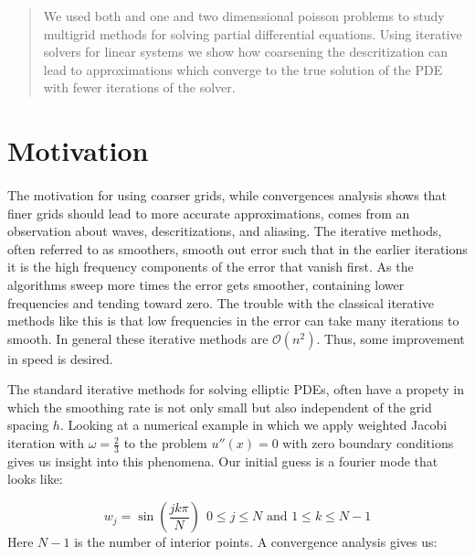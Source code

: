 \documentclass[pdftex,12pt,a4paper]{article}
\begin{document}


\vspace{2 cm}

\begin{abstract}
    We used both and one and two dimenssional poisson problems to study multigrid methods for solving partial differential equations. Using iterative solvers for linear systems we show how coarsening the descritization can lead to approximations which converge to the true solution of the PDE with fewer iterations of the solver. 
\end{abstract}

\section{Motivation}
   
    \paragraph*{} The motivation for using coarser grids, while convergences analysis shows that finer grids should lead to more accurate approximations, comes from an observation about waves, descritizations, and aliasing. The iterative methods, often referred to as smoothers, smooth out error such that in the earlier iterations it is the high frequency components of the error that vanish first. As the algorithms sweep more times the error gets smoother, containing lower frequencies and tending toward zero. The trouble with the classical iterative methods like this is that low frequencies in the error can take many iterations to smooth. In general these iterative methods are $\mathcal{O}(n^2)$. Thus, some improvement in speed is desired.

    The standard iterative methods for solving elliptic PDEs, often have a propety in which the smoothing rate is not only small but also independent of the grid spacing $h$.  Looking at a numerical example in which we apply weighted Jacobi iteration with $\omega = \frac 2 3$ to the problem $u''(x) = 0$ with zero boundary conditions gives us insight into this phenomena. Our initial guess is a fourier mode that looks like: 

    $$
    w_j = \sin \left( \frac{jk \pi}{N}\right) ~~ 0 \leq j \leq N \text{ and } 1 \leq k \leq N-1$$
    Here $N-1$ is the number of interior points.  A convergence analysis gives us:  
\end{document}
